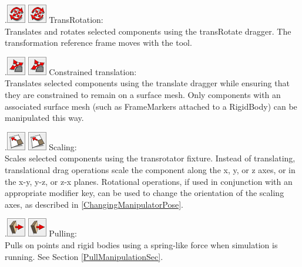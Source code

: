 \documentclass{article}
\begin{document}
\vspace{\parskip}
\iflatexml
.\includegraphics[]{images/transRotateTool}
\else
\includegraphics[width=.33in]{images/transRotateTool}
\fi
{\sf TransRotation:}\\
Translates and rotates selected components
using the transRotate dragger. The transformation reference frame
moves with the tool.

\vspace{\parskip}
\iflatexml
.\includegraphics[]{images/constrainedTool}
\else
\includegraphics[width=.33in]{images/constrainedTool}
\fi 
{\sf Constrained translation:}\\
Translates selected components using the translate dragger while ensuring that
they are constrained to remain on a surface mesh. Only components with
an associated surface mesh (such as FrameMarkers attached to a
RigidBody) can be manipulated this way.

\vspace{\parskip}
\iflatexml
.\includegraphics[]{images/scaleTool}
\else
\includegraphics[width=.33in]{images/scaleTool}
\fi
{\sf Scaling:}\\
Scales selected components using the transrotator
fixture. Instead of translating, translational drag operations
scale the component along the x, y, or z axes, or in the
x-y, y-z, or z-x planes. Rotational operations, if
used in conjunction with an appropriate modifier key,
can be used to change the orientation of the scaling axes,
as described in \ref{ChangingManipulatorPose}.

\vspace{\parskip}
\iflatexml
.\includegraphics[]{images/pullTool}
\else
\includegraphics[width=.33in]{images/pullTool}
\fi
{\sf Pulling:}\\
Pulls on points and rigid bodies using a spring-like force
when simulation is running. See Section \ref{PullManipulationSec}.
\end{document}
